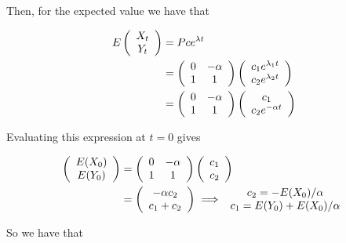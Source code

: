 \documentclass{article}
\numberwithin{questioncounter}{section}
\begin{document}
\begin{solution}
Then, for the expected value we have that

\begin{align*}
E\left(\begin{array}{c} X_{t} \\ Y_{t} \end{array} \right) &= P ce^{\lambda t} \\
&= \left(\begin{array}{c c} 0 & -\alpha \\ 1 & 1 \end{array} \right) \left(\begin{array}{c} c_{1} e^{\lambda_{1} t} \\ c_{2} e^{\lambda_{2} t} \end{array} \right) \\
&= \left(\begin{array}{c c} 0 & -\alpha \\ 1 & 1 \end{array} \right) \left(\begin{array}{c} c_{1} \\ c_{2} e^{-\alpha t} \end{array} \right)
\end{align*}

Evaluating this expression at $t = 0$ gives

\begin{align*}
\left(\begin{array}{c} E(X_{0}) \\ E(Y_{0}) \end{array} \right) &= \left(\begin{array}{c c} 0 & -\alpha \\1 & 1 \end{array} \right) \left(\begin{array}{c} c_{1} \\ c_{2} \end{array} \right) \\
&= \left(\begin{array}{c} -\alpha c_{2} \\ c_{1} + c_{2} \end{array} \right) \implies \begin{array}{c} c_{2} = -E(X_{0}) / \alpha \\ c_{1} = E(Y_{0}) + E(X_{0})/\alpha \end{array}
\end{align*}

So we have that


\end{solution}
\end{document}
